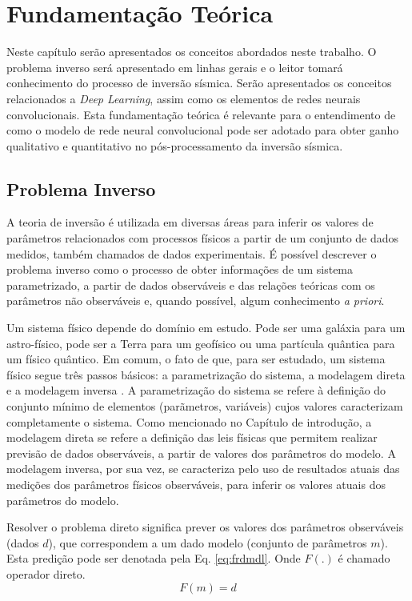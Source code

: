 \chapter{Fundamentação Teórica}
\label{cap:2fundamentacao}
Neste capítulo serão apresentados os conceitos
abordados neste trabalho. O problema inverso será apresentado
em linhas gerais e o leitor tomará conhecimento do processo de inversão sísmica.
Serão apresentados os conceitos relacionados a \textit{Deep Learning}, assim como os
elementos de redes neurais convolucionais. Esta fundamentação
teórica é relevante para o entendimento de como o modelo de rede neural convolucional
pode ser adotado para obter ganho qualitativo e quantitativo no pós-processamento
da inversão sísmica.

\section{Problema Inverso}

A teoria de inversão é utilizada em diversas áreas para inferir os valores de
parâmetros relacionados com processos físicos a partir de um conjunto de dados medidos,
também chamados de dados experimentais. É possível descrever o problema inverso
como o processo de obter informações de um sistema parametrizado, a partir de
dados observáveis e das relações teóricas com os parâmetros não
observáveis e, quando possível, algum conhecimento \textit{a priori}.

Um sistema físico depende do domínio em estudo. Pode ser uma galáxia para um
astro-físico, pode ser a Terra para um geofísico ou uma partícula quântica
para um físico quântico. Em comum, o fato de que, para ser estudado, um sistema
físico segue três passos básicos: a parametrização do sistema, a modelagem direta e a modelagem inversa \cite{tarantola}.
A parametrização do sistema se refere à definição do conjunto mínimo de elementos (parãmetros, variáveis)
cujos valores caracterizam completamente o sistema. Como mencionado no Capítulo de introdução,
a modelagem direta se refere a definição das leis físicas que permitem realizar previsão
de dados observáveis, a partir de valores dos parâmetros do modelo. A modelagem inversa,
por sua vez, se caracteriza pelo uso de resultados atuais das medições dos parâmetros
físicos observáveis, para inferir os valores atuais dos parâmetros do modelo.

Resolver o problema direto significa prever os valores dos parâmetros observáveis (dados $d$),
que correspondem a um dado modelo (conjunto de parâmetros $m$). Esta predição pode ser denotada
pela Eq. \ref{eq:frdmdl}. Onde $F(.)$ é chamado operador direto.
\begin{equation}
\label{eq:frdmdl}
F(m) = d 
\end{equation}

